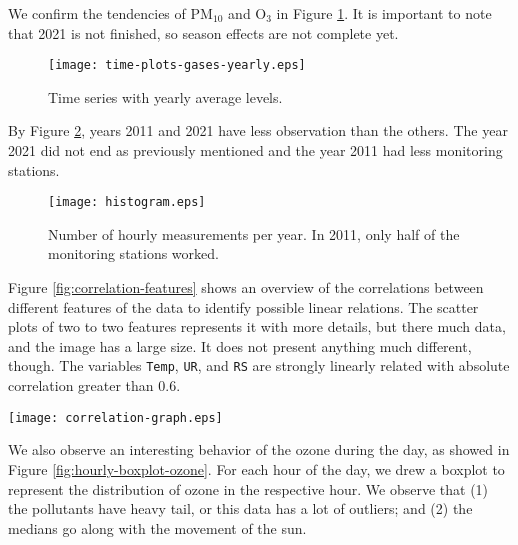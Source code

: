 We confirm the tendencies of PM$_{10}$ and O$_3$ in Figure \ref{fig:time-series-gases-year}. It is important to note that
2021 is not finished, so season effects are not complete yet.

\begin{figure}[!ht]
    \centering
    \texttt{[image: time-plots-gases-yearly.eps]}
    \caption{Time series with yearly average levels.}
    \label{fig:time-series-gases-year}
\end{figure}

By Figure \ref{fig:histogram-obs-years}, years 2011 and 2021 have less
observation than the others. The year 2021 did not end as previously
mentioned and the year 2011 had less monitoring stations.  

\begin{figure}
    \begin{center}
        \texttt{[image: histogram.eps]}
    \end{center}
    \caption{Number of hourly measurements per year. In 2011, only half of the monitoring stations worked.}
    \label{fig:histogram-obs-years}
\end{figure}

Figure \ref{fig:correlation-features} shows an overview of the correlations
between different features of the data to identify possible linear relations.
The scatter plots of two to two features represents it with more details, but
there much data, and the image has a large size. It does not present anything
much different, though. The variables {\tt Temp}, {\tt UR}, and {\tt RS} are
strongly linearly related with absolute correlation greater than 0.6.

\begin{figure*}[t]
    \begin{center}
        \texttt{[image: correlation-graph.eps]}
    \end{center}
    \caption{Correlation heat map comparing the data features.}
    \label{fig:correlation-features}
\end{figure*}

We also observe an interesting behavior of the ozone during the day, as showed
in Figure \ref{fig:hourly-boxplot-ozone}. For each hour of the day, we drew a
boxplot to represent the distribution of ozone in the respective hour. We
observe that (1) the pollutants have heavy tail, or this data has a lot of
outliers; and (2) the medians go along with the movement of the sun.

